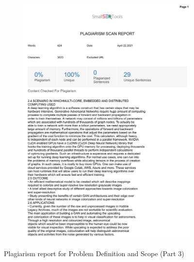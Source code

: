 \documentclass[oneside,a4paper,12pt]{report}
\begin{document}
\begin{appendices}
\begin{figure}
	\begin{subfigure}[H]{\textwidth}
		\centering
    	\includegraphics[scale=0.7, page=1]{plagiarism/problem_definition&scope_3.pdf}
    \end{subfigure}
 \caption{Plagiarism report for Problem Definition and Scope (Part 3)}
    \label{PlagiarismPDS3}
\end{figure}


\end{appendices}
\end{document}

